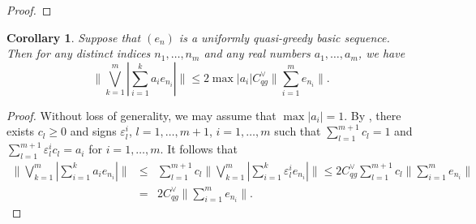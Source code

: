 \documentclass[12pt,leqno]{amsart}
\newtheorem{corollary}[theorem]{Corollary}
\numberwithin{equation}{section}
\theoremstyle{definition}
\begin{document}
\begin{proof}


\end{proof}
\begin{corollary}\label{Convex max}
Suppose that $(e_n)$ is a uniformly quasi-greedy basic sequence. Then for any distinct indices $n_1,\dots, n_m$ and any real numbers $a_1,\dots, a_m$, we have 
$$\bigg\|\bigvee_{k=1}^m\left|\sum_{i=1}^k a_ie_{n_i}\right|\bigg\|\leq 2\max |a_i|C_{qg}^\vee \bigg\|\sum_{i=1}^m e_{n_i}\bigg\|.$$
\end{corollary}
\begin{proof}
Without loss of generality, we may assume that $\max |a_i|=1$. By \cite[Theorem 3.13]{Heil10}, there exists $c_l\geq 0$ and signs $\varepsilon_l^i$, $l=1,\dots, m+1$, $i=1,\dots, m$ such that $\sum_{l=1}^{m+1}c_l=1$ and $\sum_{l=1}^{m+1}\varepsilon_l^i c_l=a_i$ for $i=1,\dots, m$. It follows that
\begin{eqnarray*}
    \bigg\|\bigvee_{k=1}^m\left|\sum_{i=1}^k a_ie_{n_i}\right|\bigg\|&\leq&\sum_{l=1}^{m+1}c_l\bigg\|\bigvee_{k=1}^m\left|\sum_{i=1}^k \varepsilon_l^ie_{n_i}\right|\bigg\|\leq 2C_{qg}^\vee\sum_{l=1}^{m+1}c_l\bigg\|\sum_{i=1}^me_{n_i}\bigg\|\\
&=&2C_{qg}^\vee \bigg\|\sum_{i=1}^me_{n_i}\bigg\|.
\end{eqnarray*}





\end{proof}
\end{document}
